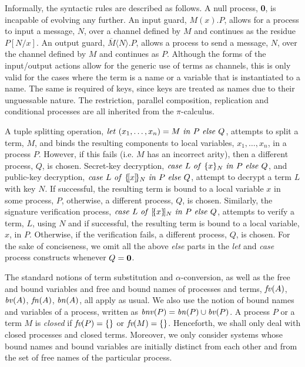 \documentclass[10pt,a4paper,final,oneside,fleqn]{book}
\begin{document}
Informally, the syntactic rules are described as follows.  A null process, {\bf 0}, is incapable of evolving any further.  An input guard, $M(x).P$, allows for a process to input a message, $N$, over a channel defined by $M$ and continues as the residue $P[N/x]$. An output guard, $\overline{M}\langle N\rangle.P$, allows a process to send a message, $N$, over the channel defined by $M$ and continues as $P$.  Although the forms of the input/output actions allow for the generic use of terms as channels, this is only valid for the cases where the term is a name or a variable that is instantiated to a name.  The same is required of keys, since keys are treated as names due to their unguessable nature.  The restriction, parallel composition, replication and conditional processes are all inherited from the $\pi$-calculus.

A tuple splitting operation, $\mbox{{\itshape let\/} }(x_1,\ldots,x_n)=M\mbox{ {\itshape in\/} }P\mbox{ {\itshape else\/} }Q$, attempts to split a term, $M$, and binds the resulting components to local variables, $x_1,\ldots,x_n$, in a process $P$.  However, if this fails (i.e. $M$ has an incorrect arity), then a different process, $Q$, is chosen.  Secret-key decryption, $\mbox{{\itshape case\/} }L\mbox{ {\itshape of\/} }\{x\}_N\mbox{ {\itshape in\/} }P\mbox{ {\itshape else\/} }Q$, and public-key decryption, $\mbox{{\itshape case\/} }L\mbox{ {\itshape of\/} }\{\![x]\!\}_N\mbox{ {\itshape in\/} }P\mbox{ {\itshape else\/} }Q$, attempt to decrypt a term $L$ with key $N$.  If successful, the resulting term is bound to a local variable $x$ in some process, $P$, otherwise, a different process, $Q$, is chosen.  Similarly, the signature verification process, $\mbox{{\itshape case\/} }L\mbox{ {\itshape of\/} }[\!\{x\}\!]_N\mbox{ {\itshape in\/} }P\mbox{ {\itshape else\/} }Q$, attempts to verify a term, $L$, using $N$ and if successful, the resulting term is bound to a local variable, $x$, in $P$.  Otherwise, if the verification fails, a different process, $Q$, is chosen.  For the sake of conciseness, we omit all the above {\itshape else\/} parts in the {\itshape let\/} and {\itshape case\/} process constructs whenever $Q={\bf 0}$.

The standard notions of term substitution and $\alpha$-conversion, as well as the free and bound variables and free and bound names of processes and terms, $\mbox{{\itshape fv\/}}(A)$, $\mbox{{\itshape bv\/}}(A)$, $\mbox{{\itshape fn\/}}(A)$, $\mbox{{\itshape bn\/}}(A)$, all apply as usual.  We also use the notion of bound names and variables of a process, written as $\mbox{{\itshape bnv\/}}(P)=\mbox{{\itshape bn\/}}(P)\cup\mbox{{\itshape bv\/}}(P)$. A process $P$ or a term $M$ is {\itshape closed\/} if $\mbox{{\itshape fv}}(P)=\{\}$ or $\mbox{{\itshape fv}}(M)=\{\}$.  Henceforth, we shall only deal with closed processes and closed terms.  Moreover, we only consider systems whose bound names and bound variables are initially distinct from each other and from the set of free names of the particular process.
\end{document}
